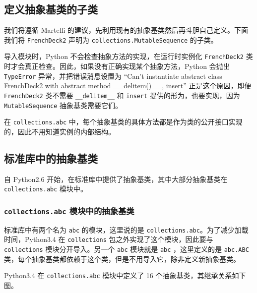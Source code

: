 \subsection{定义抽象基类的子类}

我们将遵循 Martelli 的建议，先利用现有的抽象基类然后再斗胆自己定义。下面我们将 \texttt{FrenchDeck2} 声明为 \texttt{collections.MutableSequence} 的子类。



导入模块时，Python 不会检查抽象方法的实现，在运行时实例化 \texttt{FrenchDeck2} 类时才会真正检查。因此，如果没有正确实现某个抽象方法，Python 会抛出 \texttt{TypeError} 异常，并把错误消息设置为 ``Can't instantiate abstract class FrenchDeck2 with abstract method \_\_delitem()\_\_, insert'' 正是这个原因，即便 \texttt{FrenchDeck2} 类不需要 \texttt{\_\_delitem\_\_} 和 \texttt{insert} 提供的形为，也要实现，因为 \texttt{MutableSequence} 抽象基类需要它们。

在 \texttt{collections.abc} 中，每个抽象基类的具体方法都是作为类的公开接口实现的，因此不用知道实例的内部结构。

\subsection{标准库中的抽象基类}

自 Python2.6 开始，在标准库中提供了抽象基类，其中大部分抽象基类在 \texttt{collections.abc} 模块中。

\subsubsection{\texttt{collections.abc} 模块中的抽象基类}

标准库中有两个名为 \texttt{abc} 的模块，这里说的是 \texttt{collections.abc}。为了减少加载时间，Python3.4 在 \texttt{collections} 包之外实现了这个模块，因此要与 \texttt{collections} 模块分开导入。另一个 \texttt{abc} 模块就是 \texttt{abc} ，这里定义的是 \texttt{abc.ABC} 类，每个抽象基类都依赖于这个类，但是不用导入它，除非定义新抽象基类。
 
Python3.4 在 \texttt{collections.abc} 模块中定义了 16 个抽象基类，其继承关系如下图。

